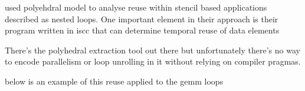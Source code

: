 \cite{meeus} used polyehdral model to analyse reuse within stencil based applications described
as nested loops. One important element in their approach is their program written in iscc that
can determine temporal reuse of data elements

There's the polyhedral extraction tool out there but unfortunately there's no
way to encode parallelism or loop unrolling in it without relying on compiler
pragmas. 

below is an example of this reuse applied to the gemm loops




